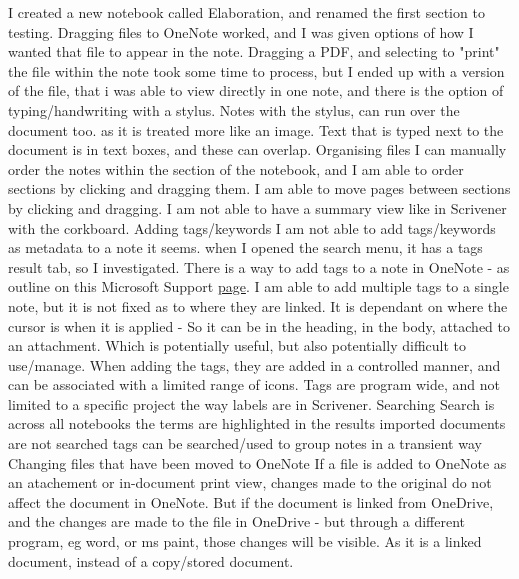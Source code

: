 \documentclass{article}
\begin{document}
\begin{outline}
    \1 I created a new notebook called Elaboration, and renamed the first section to testing.
    \1 Dragging files to OneNote worked, and I was given options of how I wanted that file to appear in the note. 
        \2 Dragging a PDF, and selecting to "print" the file within the note took some time to process, but I ended up with a version of the file, that i was able to view directly in one note, and there is the option of typing/handwriting with a stylus. Notes with the stylus, can run over the document too. as it is treated more like an image.
        \2 Text that is typed next to the document is in text boxes, and these can overlap.
    \1 Organising files
        \2 I can manually order the notes within the section of the notebook, and I am able to order sections by clicking and dragging them. I am able to move pages between sections by clicking and dragging.
        \2 I am not able to have a summary view like in Scrivener with the corkboard.
    \1 Adding tags/keywords
        \2 I am not able to add tags/keywords as metadata to a note it seems.
        \2 when I opened the search menu, it has a tags result tab, so I investigated.
        \2 There is a way to add tags to a note in OneNote - as outline on this Microsoft Support \href{https://support.office.com/en-us/article/apply-a-tag-to-a-note-in-onenote-908c7b92-6ed0-498d-bc7d-1b44e6827d05}{page}.
        \2 I am able to add multiple tags to a single note, but it is not fixed as to where they are linked. It is dependant on where the cursor is when it is applied - So it can be in the heading, in the body, attached to an attachment. Which is potentially useful, but also potentially difficult to use/manage.
        \2 When adding the tags, they are added in a controlled manner, and can be associated with a limited range of icons. Tags are program wide, and not limited to a specific project the way labels are in Scrivener.
    \1 Searching
        \2 Search is across all notebooks
        \2 the terms are highlighted in the results
        \2 imported documents are not searched
        \2 tags can be searched/used to group notes in a transient way
    \1 Changing files that have been moved to OneNote
        \2 If a file is added to OneNote as an atachement or in-document print view, changes made to the original do not affect the document in OneNote. But if the document is linked from OneDrive, and the changes are made to the file in OneDrive - but through a different program, eg word, or ms paint, those changes will be visible. As it is a linked document, instead of a copy/stored document.
\end{outline}
\end{document}
